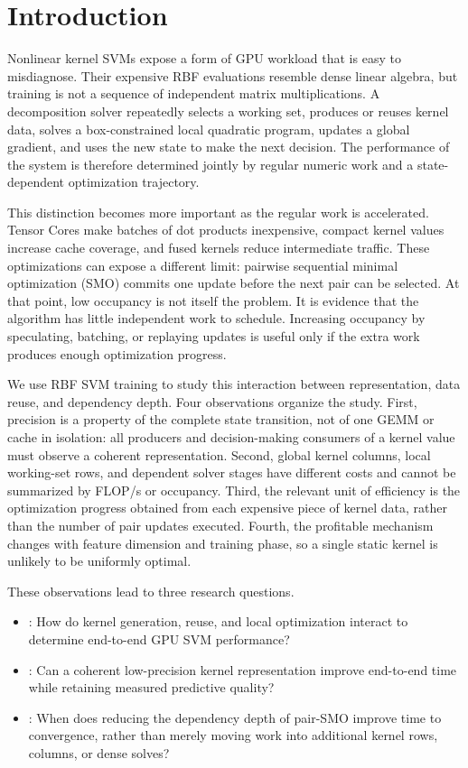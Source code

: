 \section{Introduction}

Nonlinear kernel SVMs expose a form of GPU workload that is easy to
misdiagnose. Their expensive RBF evaluations resemble dense linear algebra,
but training is not a sequence of independent matrix multiplications. A
decomposition solver repeatedly selects a working set, produces or reuses
kernel data, solves a box-constrained local quadratic program, updates a
global gradient, and uses the new state to make the next decision. The
performance of the system is therefore determined jointly by regular numeric
work and a state-dependent optimization trajectory.

This distinction becomes more important as the regular work is accelerated.
Tensor Cores make batches of dot products inexpensive, compact kernel values
increase cache coverage, and fused kernels reduce intermediate traffic. These
optimizations can expose a different limit: pairwise sequential minimal
optimization (SMO) commits one update before the next pair can be selected.
At that point, low occupancy is not itself the problem. It is evidence that
the algorithm has little independent work to schedule. Increasing occupancy
by speculating, batching, or replaying updates is useful only if the extra
work produces enough optimization progress.

We use RBF SVM training to study this interaction between representation,
data reuse, and dependency depth. Four observations organize the study.
First, precision is a property of the complete state transition, not of one
GEMM or cache in isolation: all producers and decision-making consumers of a
kernel value must observe a coherent representation. Second, global kernel
columns, local working-set rows, and dependent solver stages have different
costs and cannot be summarized by FLOP/s or occupancy. Third, the relevant
unit of efficiency is the optimization progress obtained from each expensive
piece of kernel data, rather than the number of pair updates executed. Fourth,
the profitable mechanism changes with feature dimension and training phase,
so a single static kernel is unlikely to be uniformly optimal.

These observations lead to three research questions.

\begin{itemize}
  \item {}: How do kernel generation, reuse, and local optimization
        interact to determine end-to-end GPU SVM performance?
  \item {}: Can a coherent low-precision kernel representation
        improve end-to-end time while retaining measured predictive quality?
  \item {}: When does reducing the dependency depth of pair-SMO
        improve time to convergence, rather than merely moving work into
        additional kernel rows, columns, or dense solves?
\end{itemize}

